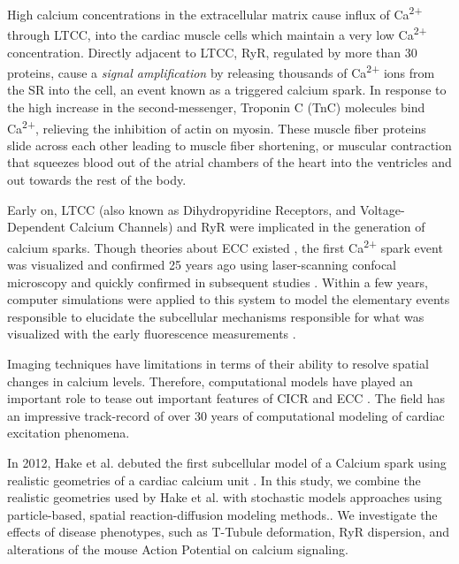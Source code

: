 \documentclass[12pt]{ucsddissertation}
\begin{document}
High calcium concentrations in the extracellular matrix cause influx of Ca\textsuperscript{2+} through LTCC, into the cardiac muscle cells which maintain a very low Ca\textsuperscript{2+}  concentration. Directly adjacent to LTCC, RyR, regulated by more than 30 proteins\cite{Fill2002}, cause a \textit{signal amplification} by releasing thousands of Ca\textsuperscript{2+}  ions from the SR into the cell, an event known as a triggered calcium spark. In response to the high increase in the second-messenger, Troponin C (TnC) molecules bind Ca\textsuperscript{2+}, relieving the inhibition of actin on myosin. These muscle fiber proteins slide across each other leading to muscle fiber shortening, or muscular contraction that squeezes blood out of the atrial chambers of the heart into the ventricles and out towards the rest of the body. 

Early on, LTCC (also known as Dihydropyridine Receptors, and Voltage-Dependent Calcium Channels) \cite{Lu1994} and RyR \cite{Stern1999} were implicated in the generation of calcium sparks. Though theories about ECC existed \cite{Stern1992}, the first Ca\textsuperscript{2+} spark event was visualized and confirmed 25 years ago using laser-scanning confocal microscopy \cite{Cheng1993} and quickly confirmed in subsequent studies \cite{Cannell1994,Cannell1995}. Within a few years, computer simulations were applied to this system to model the elementary events responsible to elucidate the subcellular mechanisms responsible for what was visualized with the early fluorescence measurements \cite{Cannell1997}. 

Imaging techniques have limitations in terms of their ability to resolve spatial changes in calcium levels. Therefore, computational models have played an important role to tease out important features of CICR and ECC \cite{Maleckar2017}. The field has an impressive track-record of over 30 years of computational modeling of cardiac excitation phenomena. 

In 2012, Hake et al. debuted the first subcellular model of a Calcium spark \cite{Hake2012} using realistic geometries of a cardiac calcium unit \cite{Hayashi2009}.  In this study, we combine the realistic geometries used by Hake et al. with stochastic models approaches using particle-based, spatial reaction-diffusion modeling methods.\cite{Hirakis2018}. We investigate the effects of disease phenotypes, such as T-Tubule deformation\cite{Louch2010}, RyR dispersion\cite{Kolstad2018}, and alterations of the mouse Action Potential\cite{Morotti2014} on calcium signaling. 
\end{document}
